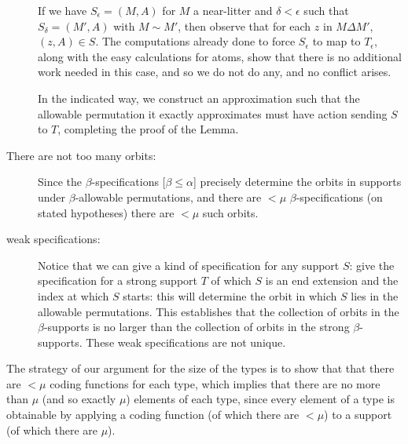\documentclass[112pt]{article}
\begin{document}
\begin{description}
If we have $S_\epsilon=(M,A)$ for $M$ a near-litter and $\delta<\epsilon$ such that
$S_\delta = (M',A)$ with $M \sim M'$, then observe that for each $z$ in $M \Delta M'$,
$(z,A) \in S$.  The computations already done to force $S_\epsilon$ to map to $T_\epsilon$, along with the easy calculations for atoms, show that there is no additional work needed in this case, and so we do not do any, and no conflict arises.

In the indicated way, we construct an approximation such that the allowable permutation it exactly approximates must have action sending $S$ to $T$, completing the proof of the Lemma.

\item[There are not too many orbits:]  Since the $\beta$-specifications [$\beta \leq \alpha$] precisely determine the orbits in supports under $\beta$-allowable permutations, and there are $<\mu$ $\beta$-specifications
(on stated hypotheses) there are $<\mu$ such orbits.

\item[weak specifications:]  Notice that we can give a kind of specification for any support $S$:  give the specification for a strong support $T$ of which $S$ is an end extension and the index at which $S$ starts:  this will determine the orbit in which $S$ lies in the allowable permutations.
This establishes that the collection of orbits in the $\beta$-supports is no larger than the collection of orbits in the strong $\beta$-supports.  These weak specifications are not unique.

\end{description}





The strategy of our argument for the size of the types is to show that that there are $<\mu$ coding functions for each type, which implies that there are no more than $\mu$ (and so exactly $\mu$) elements of each type, since every element of a type is obtainable by applying a coding function (of which there are $<\mu$) to a support (of which there are $\mu$).
\end{document}
